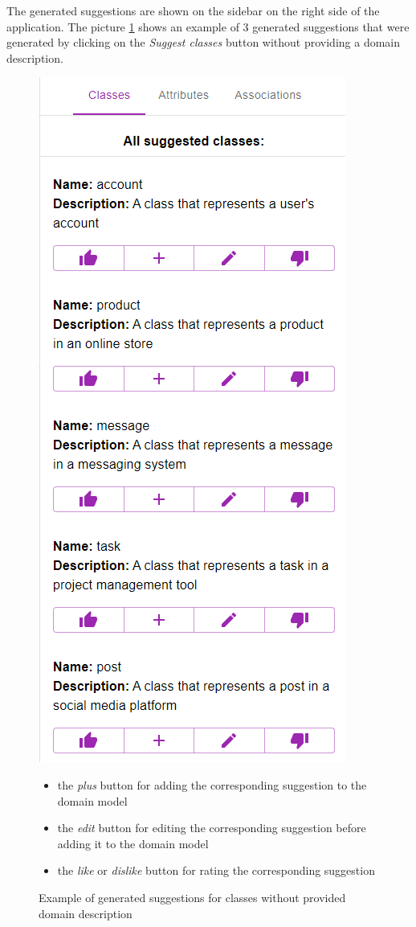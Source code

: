 The generated suggestions are shown on the sidebar on the right side of the application. The picture \ref{fig:suggested_classes} shows an example of 3 generated suggestions that were generated by clicking on the \textit{Suggest classes} button without providing a domain description.

\begin{figure}[!h]
    \includegraphics[scale=0.47]{../docs/images/frontend/suggested-classes.png} \\
    \begin{itemize}
    \item the \textit{plus} button for adding the corresponding suggestion to the domain model
    \item the \textit{edit} button for editing the corresponding suggestion before adding it to the domain model
    \item the \textit{like} or \textit{dislike} button for rating the corresponding suggestion
    \end{itemize}
    \caption{\centering Example of generated suggestions for classes without provided domain description}
    \label{fig:suggested_classes}
\end{figure}

